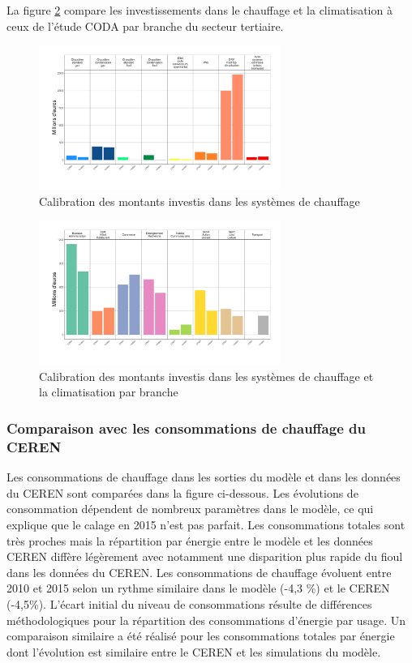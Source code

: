 \documentclass[10.5pt,a4paper]{article}
\begin{document}
{La figure \ref{Comparaison_CVCbranche_CODA} compare les investissements dans le chauffage et la climatisation à ceux de l'étude CODA par branche du secteur tertiaire. 


\begin{figure}[h!]
\centering
\caption{Calibration des montants investis dans les systèmes de chauffage}\label{Comparaison_CVCparsyst_CODA}
\includegraphics[width = 0.7\textwidth]{Comparaison_CVC_par_systeme_CODA}  
\end{figure}


\begin{figure}[h!]
\centering
\caption{Calibration des montants investis dans les systèmes de chauffage et la climatisation par branche }\label{Comparaison_CVCbranche_CODA}
\includegraphics[width = 0.7\textwidth]{Comparaison_CVC_CODA}  
\end{figure}


\subsubsection{Comparaison avec les consommations de chauffage du CEREN}

Les consommations de chauffage dans les sorties du modèle et dans les données du CEREN sont comparées dans la figure ci-dessous. Les évolutions de consommation dépendent de nombreux paramètres dans le modèle, ce qui explique que le calage en 2015 n’est pas parfait. Les consommations totales sont très proches mais la répartition par énergie entre le modèle et les données CEREN diffère légèrement avec notamment une disparition plus rapide du fioul dans les données du CEREN. Les consommations de chauffage évoluent entre 2010 et 2015 selon un rythme similaire dans le modèle (-4,3 \%) et le CEREN (-4,5\%). L’écart initial du niveau de consommations résulte de différences méthodologiques pour la répartition des consommations d’énergie par usage. Un comparaison similaire a été réalisé pour les consommations totales par énergie dont l'évolution est similaire entre le CEREN et les simulations du modèle. 

}
\end{document}
